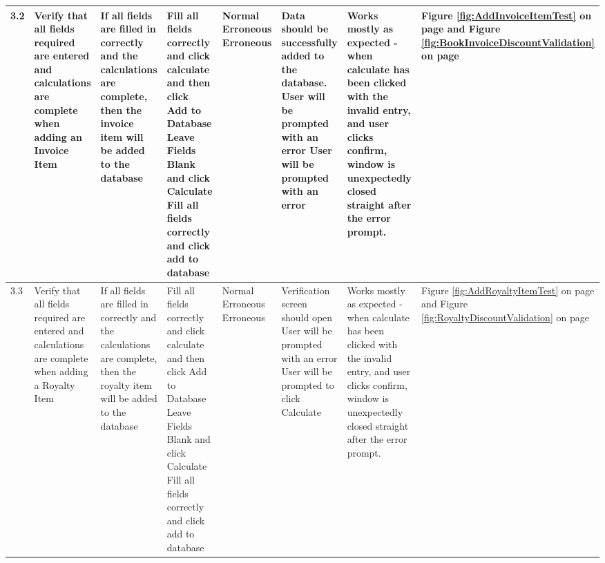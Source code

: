 \begin{landscape}
\begin{center}
\begin{longtable}{|p{1.5cm}|p{2cm}|p{2.5cm}|p{2.5cm}|p{2cm}|p{2cm}|p{2cm}|p{2cm}|}
        3.2 & Verify that all fields required are entered and calculations are complete when adding an Invoice Item & If all fields are filled in correctly and the calculations are complete, then the invoice item will be added to the database & Fill all fields correctly and click calculate and then click Add to Database \newline Leave Fields Blank and click Calculate \newline Fill all fields correctly and click add to database & Normal \newline Erroneous \newline Erroneous & Data should be successfully added to the database. \newline User will be prompted with an error \newline User will be prompted with an error & Works mostly as expected - when calculate has been clicked with the invalid entry, and user clicks confirm, window is unexpectedly closed straight after the error prompt. & Figure \ref{fig:AddInvoiceItemTest} on page \pageref{fig:AddInvoiceItemTest} and Figure \ref{fig:BookInvoiceDiscountValidation} on page \pageref{fig:BookInvoiceDiscountValidation} \\ \hline
        3.3 & Verify that all fields required are entered and calculations are complete when adding a Royalty Item & If all fields are filled in correctly and the calculations are complete, then the royalty item will be added to the database & Fill all fields correctly and click calculate and then click Add to Database \newline Leave Fields Blank and click Calculate \newline Fill all fields correctly and click add to database & Normal \newline Erroneous \newline Erroneous & Verification screen should open \newline User will be prompted with an error \newline User will be prompted to click Calculate & Works mostly as expected - when calculate has been clicked with the invalid entry, and user clicks confirm, window is unexpectedly closed straight after the error prompt. & Figure \ref{fig:AddRoyaltyItemTest} on page \pageref{fig:AddRoyaltyItemTest} and Figure \ref{fig:RoyaltyDiscountValidation} on page \pageref{fig:RoyaltyDiscountValidation} \\ \hline

\end{longtable}
\end{center}
\end{landscape}
